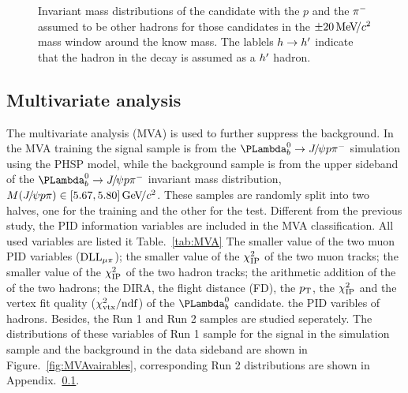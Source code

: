 \begin{figure}[!tbh]
\begin{minipage}[t]{1.0\textwidth}
\end{minipage}
\caption{
  Invariant mass distributions of the \LbJpsippi candidate with the $p$ and the ${{\pi}^-}$ assumed to be other hadrons 
   for those \Lb candidates in the $\pm20\text{\,Me\kern -0.1em V\!/}c^2$ mass window around the know \Lb mass.
  The lablels ${h}\rightarrow{\ensuremath{h}}'$ indicate that the \hadron hadron in the \LbJpsippi decay is assumed as a ${h}'$ hadron.
}
\label{fig:Reflections}
\end{figure}



\subsection{Multivariate analysis}

The multivariate analysis (MVA) is used to further suppress the background. 
In the MVA training the signal sample is from the $\LbJpsiPPi$ simulation using the PHSP model, 
while the background sample is from the upper sideband of the $\LbJpsiPPi$ invariant mass distribution, 
$M({{J\mskip -3mu/\mskip -2mu\psi}} p\pi)\in[5.67,5.80]\text{\,Ge\kern -0.1em V\!/}c^2$.
These samples are randomly split into two halves, one for the training and the other for the test.
Different from the previous study,
the PID information variables are included in the MVA classification.
All used variables are listed it Table.~\ref{tab:MVA}
The smaller value of the two muon PID variables ($\mathrm{DLL}_{{\mu}\pi}$);
the smaller value of the $\chi^2_{\text{IP}}$ of the two muon tracks;
the smaller value of the $\chi^2_{\text{IP}}$ of the two hadron tracks;
the arithmetic addition of the \pt of the two hadrons;
the DIRA, the flight distance (FD), the $p_{\mathrm{T}}$, the $\chi^2_{\text{IP}}$ and the vertex fit quality ($\chi^2_{\text{vtx}}/\mathrm{ndf}$) of the $\Lb$ candidate.
the PID varibles of hadrons.
Besides,
the Run 1 and Run 2 samples are studied seperately.
The distributions of these variables of Run 1 sample for the signal in the simulation sample and the background in the data sideband 
are shown in Figure.~\ref{fig:MVAvairables},
corresponding Run 2 distributions are shown in Appendix.~\ref{}.

